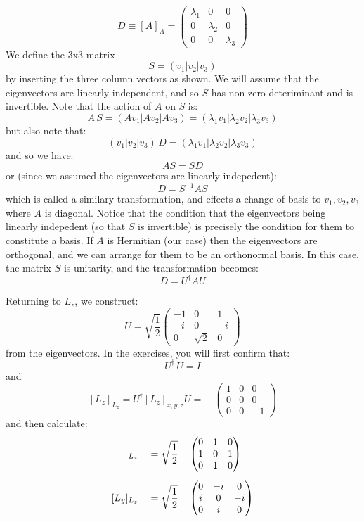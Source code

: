 \documentclass[12pt]{article}
\begin{document}
$$D \equiv [A]_A = \begin{pmatrix} \lambda_1 & 0 & 0 \\ 0 & \lambda_2 & 0 \\ 0 & 0 & \lambda_3 \end{pmatrix}$$
We define the 3x3 matrix
$$S=(v_1 | v_2 | v_3)$$
by inserting the three column vectors as shown.  We will assume that
the eigenvectors are linearly independent, and so $S$ has non-zero
deteriminant and is invertible.  Note that the
action of $A$ on $S$ is:
$$A\,S= (A v_1 | A v_2 | A v_3) = (\lambda_1 v_1 | \lambda_2 v_2 | \lambda_3 v_3)$$
but also note that:
$$(v_1 | v_2 | v_3)\, D = (\lambda_1 v_1| \lambda_2 v_2 | \lambda_3 v_3)$$
and so we have:
$$A S = S D$$
or (since we assumed the eigenvectors are linearly indepedent):
$$D = S^{-1} A S $$ which is called a similary transformation, and
effects a change of basis to ${v_1, v_2, v_3}$ where $A$ is diagonal.
Notice that the condition that the eigenvectors being linearly
indepedent (so that $S$ is invertible) is precisely the condition for
them to constitute a basis.  If $A$ is Hermitian (our case) then the
eigenvectors are orthogonal, and we can arrange for them to be an
orthonormal basis.  In this case, the matrix $S$ is unitarity, and the
transformation becomes:
$$D = U^\dagger A U$$

\noindent
Returning to $L_z$, we construct:
\begin{equation}
\label{eqn:diagnolize}
U = \sqrt{\frac{1}{2}} \begin{pmatrix} -1 & 0 & 1 \\ -i & 0 & -i \\ 0 & \sqrt{2} & 0 \end{pmatrix}
\end{equation}
from the eigenvectors.  In the exercises, you will first confirm that:
\begin{equation}
U^\dagger \, U = I
\end{equation}
and
\begin{equation}
  \label{eqn:lz}
  [L_z]_{L_z} = U^\dagger [L_z]_{x,y,z} U = \quad \begin{pmatrix}1&0&0\\0&0&0\\0&0&-1\end{pmatrix}
\end{equation}
and then calculate:
\begin{align}    
  [L_x]_{L_z} \quad &= \sqrt{\frac{1}{2}} \quad \begin{pmatrix}0&1&0\\1&0&1\\0&1&0\end{pmatrix} \notag\\[5pt]
    \label{eqn:lxy}
  [L_y]_{L_z} \quad &= \sqrt{\frac{1}{2}} \quad \begin{pmatrix}0&-i&0\\i&0&-i\\0&i&0\end{pmatrix}\\
    \notag
\end{align}
\end{document}
